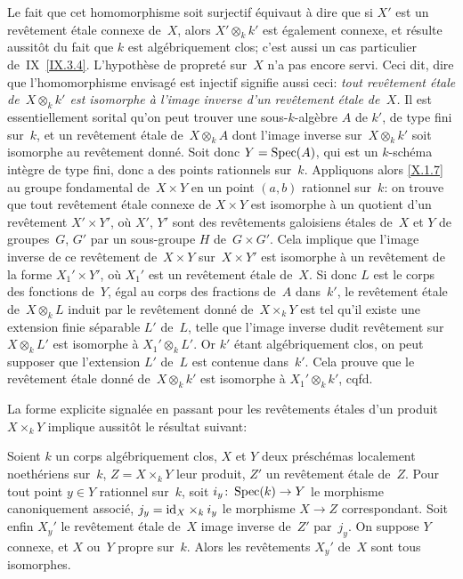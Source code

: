 Le fait que cet homomorphisme soit surjectif \'equivaut \`a dire
que si $X'$ est un rev\^etement \'etale connexe de~$X$, alors
$X'\otimes_k k'$ est \'egalement connexe, et r\'esulte
aussit\^ot du fait que $k$ est alg\'ebriquement clos; c'est aussi
un cas particulier
de~IX~\ref{IX.3.4}.
L'hypoth\`ese de propret\'e sur~$X$ n'a pas encore servi. Ceci
dit, dire que l'homomorphisme envisag\'e est injectif signifie aussi
ceci: \emph{tout revêtement étale de~$X\otimes_k k'$ est
isomorphe à l'image inverse d'un revêtement étale de~$X$.}
Il est essentiellement sorital qu'on peut trouver une
sous-$k$-alg\`ebre $A$ de
$k'$,
de type fini sur~$k$, et un
rev\^etement \'etale de~$X\otimes_k A$ dont l'image inverse sur~$X\otimes_k k'$ soit isomorphe au rev\^etement donn\'e. Soit donc
$Y=\operatorname{Spec}(A)$, qui est un $k$-sch\'ema int\`egre de type fini, donc
a des points rationnels sur~$k$. Appliquons alors \ref{X.1.7} au
groupe fondamental de~$X\times Y$ en un point $(a,b)$ rationnel
sur~$k$: on trouve que tout rev\^etement \'etale connexe de
$X\times Y$ est isomorphe \`a un quotient d'un rev\^etement
$X'\times Y'$, o\`u $X'$, $Y'$ sont des rev\^etements galoisiens
\'etales de~$X$ et $Y$ de groupes~$G$, $G'$ par un sous-groupe $H$
de~$G\times G'$. Cela implique que l'image inverse de ce
rev\^etement de~$X\times Y$ sur~$X\times Y'$ est isomorphe \`a un
rev\^etement de la forme $X_1'\times Y'$, o\`u $X_1'$ est un
rev\^etement \'etale de~$X$. Si donc $L$ est le corps des
fonctions de~$Y$, \'egal au corps des fractions de~$A$ dans~$k'$, le
rev\^etement \'etale de~$X\otimes_k L$ induit par le
rev\^etement donn\'e de~$X\times_k Y$ est tel qu'il existe une
extension finie s\'eparable $L'$ de~$L$, telle que l'image inverse
dudit rev\^etement sur~$X\otimes_k L'$ est isomorphe \`a
$X_1'\otimes_k L'$. Or $k'$ \'etant alg\'ebriquement clos, on peut
supposer que l'extension $L'$ de~$L$ est contenue dans~$k'$. Cela
prouve que le rev\^etement \'etale donn\'e de~$X\otimes_k k'$
est isomorphe \`a $X_1'\otimes_k k'$, cqfd.

La forme explicite signal\'ee en passant pour les rev\^etements
\'etales d'un produit
$X\times_k Y$ implique aussit\^ot le r\'esultat suivant:

\begin{corollaire}
\label{X.1.9}
Soient $k$ un corps alg\'ebriquement clos, $X$ et $Y$ deux
pr\'esch\'emas localement noeth\'eriens sur~$k$, $Z=X\times_k
Y$ leur produit, $Z'$ un rev\^etement \'etale de~$Z$. Pour tout
point $y\in Y$ rationnel sur~$k$, soit $i_y \colon \Spec(k)\to Y$ le
morphisme canoniquement associ\'e, $j_y = \mathrm{id}_X\times_k i_y$ le
morphisme $X\to Z$ correspondant. Soit enfin $X_y'$ le rev\^etement
\'etale de~$X$ image inverse de~$Z'$ par~$j_y$. On suppose $Y$
connexe, et $X$ ou~$Y$ propre sur~$k$. Alors les rev\^etements
$X_y'$ de~$X$ sont tous isomorphes.
\end{corollaire}

